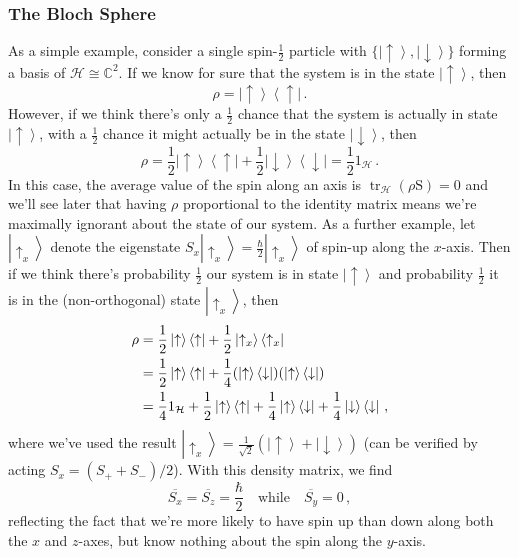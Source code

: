 \documentclass{article}
\theoremstyle{plain}\theoremheaderfont{\normalfont\itshape}\theorembodyfont{\rmfamily}\theoremseparator{.}\newtheorem*{rem}{Remark}\newtheorem*{ex}{Example}\newtheorem*{proof}{Proof}\newtheorem*{altp}{Alternative proof}
\theoremstyle{plain}\theoremheaderfont{\normalfont\bfseries}\theorembodyfont{\rmfamily}\theoremseparator{.}\newtheorem{thm}{Theorem}[section]\newtheorem{lem}[thm]{Lemma}\newtheorem{prop}[thm]{Proposition}\newtheorem*{cor}{Corollary}\newtheorem{defn}[thm]{Definition}\newtheorem{clm}[thm]{Claim}\newtheorem{clminproof}{Claim}
\theoremstyle{break}\theoremheaderfont{\normalfont\itshape}\theorembodyfont{\rmfamily}\theoremseparator{.\medskip}\newtheorem*{proofskip}{Proof}\newtheorem*{exs}{Examples}\newtheorem*{rems}{Remarks}
\theoremstyle{break}\theoremheaderfont{\normalfont\bfseries}\theorembodyfont{\rmfamily}\theoremseparator{.\medskip}\newtheorem{lemskip}[thm]{Lemma}\newtheorem{defnskip}[thm]{Definition}\newtheorem{propskip}[thm]{Proposition}\newtheorem{thmskip}[thm]{Theorem}
\numberwithin{equation}{section}
\newcommand{\bra}[1]{\left\langle #1 \right|}
\newcommand{\ket}[1]{\left| #1 \right\rangle}
\newcommand{\vb}[1]{\bm{\mathrm{#1}}}
\newcommand{\hb}{\mathcal{H}}
\DeclareMathOperator{\tr}{tr}
\newcommand{\CC}{\mathbb{C}}
\begin{document}
    \subsubsection{The Bloch Sphere}
    As a simple example, consider a single spin-\(\frac{1}{2}\) particle with \(\{\ket{\uparrow},\ket{\downarrow}\}\) forming a basis of \(\hb\cong\CC^2\). If we know for sure that the system is in the state \(\ket{\uparrow}\), then
    \begin{equation}
        \rho=\ket{\uparrow}\bra{\uparrow}\,.
    \end{equation}
    However, if we think there's only a \(\frac{1}{2}\) chance that the system is actually in state \(\ket{\uparrow}\), with a \(\frac{1}{2}\) chance it might actually be in the state \(\ket{\downarrow}\), then
    \begin{equation}
        \rho=\frac{1}{2}\ket{\uparrow}\bra{\uparrow}+\frac{1}{2}\ket{\downarrow}\bra{\downarrow}=\frac{1}{2}1_{\hb}\,.
    \end{equation}
    In this case, the average value of the spin along an axis is \(\tr_\hb(\rho\vb{S})=0\) and we'll see later that having \(\rho\) proportional to the identity matrix means we're maximally ignorant about the state of our system. As a further example, let \(\ket{\uparrow_x}\) denote the eigenstate \(S_x\ket{\uparrow_x}=\frac{\hbar}{2}\ket{\uparrow_x}\) of spin-up along the \(x\)-axis. Then if we think there's probability \(\frac{1}{2}\) our system is in state \(\ket{\uparrow}\) and probability \(\frac{1}{2}\) it is in the (non-orthogonal) state \(\ket{\uparrow_x}\), then
    \begin{align}
        \rho&=\frac{1}{2}\ket{\uparrow}\bra{\uparrow}+\frac{1}{2}\ket{\uparrow_x}\bra{\uparrow_x}\notag\\
        &=\frac{1}{2}\ket{\uparrow}\bra{\uparrow}+\frac{1}{4}(\ket{\uparrow}\bra{\downarrow})(\ket{\uparrow}\bra{\downarrow})\notag\\
        &=\frac{1}{4}1_\hb+\frac{1}{2}\ket{\uparrow}\bra{\uparrow}+\frac{1}{4}\ket{\uparrow}\bra{\downarrow}+\frac{1}{4}\ket{\downarrow}\bra{\downarrow}\,,
    \end{align}
    where we've used the result \(\ket{\uparrow_x}=\frac{1}{\sqrt{2}}(\ket{\uparrow}+\ket{\downarrow})\) (can be verified by acting \(S_x=(S_+ + S_-)/2\)). With this density matrix, we find
    \begin{equation}
        \overline{S_x}=\overline{S_z}=\frac{\hbar}{2}\quad\text{while}\quad\overline{S_y}=0\,,
    \end{equation}
    reflecting the fact that we're more likely to have spin up than down along both the \(x\) and \(z\)-axes, but know nothing about the spin along the \(y\)-axis.
\end{document}
